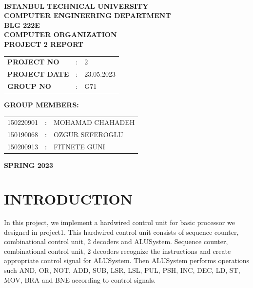\documentclass[pdftex,12pt,a4paper]{article}
\begin{document}
\begin{titlepage}
\begin{center}
\textbf{}\\
\textbf{\Large{ISTANBUL TECHNICAL UNIVERSITY}}\\
\vspace{0.5cm}
\textbf{\Large{COMPUTER ENGINEERING DEPARTMENT}}\\
\vspace{2cm}
\textbf{\Large{BLG 222E\\ COMPUTER ORGANIZATION\\ PROJECT 2 REPORT}}\\
\vspace{2.8cm}
\begin{table}[ht]
\centering
\Large{
\begin{tabular}{lcl}
\textbf{PROJECT NO}  & : & 2 \\
\textbf{PROJECT DATE}  & : & 23.05.2023 \\
\textbf{GROUP NO}  & : & G71 \\
\end{tabular}}
\end{table}
\vspace{1cm}
\textbf{\Large{GROUP MEMBERS:}}\\
\begin{table}[ht]
\centering
\Large{
\begin{tabular}{rcl}
150220901  & : & MOHAMAD CHAHADEH\\
150190068  & : & OZGUR SEFEROGLU\\
150200913  & : & FITNETE GUNI \\
\end{tabular}}
\end{table}
\vspace{2.8cm}
\textbf{\Large{SPRING 2023}}

\end{center}

\end{titlepage}

\tableofcontents
\clearpage

\setcounter{page}{1}

\section{INTRODUCTION}
In this project, we implement a hardwired control unit for basic processor we designed in project1. This hardwired control unit consists of sequence counter, combinational control unit, 2 decoders and ALUSystem. Sequence counter, combinational control unit, 2 decoders recognize the instructions and create appropriate control signal for ALUSystem. Then ALUSystem performs operations such AND, OR, NOT, ADD, SUB, LSR, LSL, PUL, PSH, INC, DEC, LD, ST, MOV, BRA and BNE according to control signals.
\end{document}
